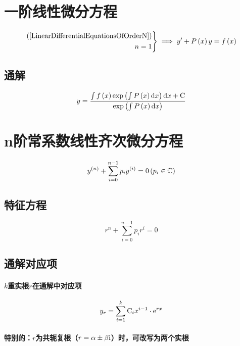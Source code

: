 \documentclass{article}
\begin{document}
\section{一阶线性微分方程}

\begin{definition}
    \[\left.\begin{aligned}
            \left(\ref{LinearDifferentialEquationsOfOrderN}\right) \\
            n=1
        \end{aligned}\right\}
        \implies
        y^\prime+P\left(x\right)y=f\left(x\right)\]
\end{definition}

\subsection{通解}

\[y=\frac{\int{f\left(x\right)\exp\left(\int P\left(x\right)\mathrm dx\right)\mathrm dx}+\mathrm C}{\exp\left(\int P\left(x\right)\mathrm d x\right)}\]

\section{n阶常系数线性齐次微分方程}

\begin{definition}[]
    \[y^{\left(n\right)}+\sum_{i=0}^{n-1}p_iy^{\left(i\right)}=0\left(p_i\in\mathbb C\right)\]
\end{definition}

\subsection{特征方程}

\[r^n+\sum_{i=0}^{n-1}p_ir^i=0\]

\subsection{通解对应项}

\paragraph{$k$重实根$r$在通解中对应项}

\[y_r=\sum_{i=1}^k\mathrm C_ix^{i-1}\cdot\mathrm e^{rx}\]

\paragraph{特别的：$r$为共轭复根（$r=\alpha\pm\beta\mathrm i$）时，可改写为两个实根}
\end{document}
